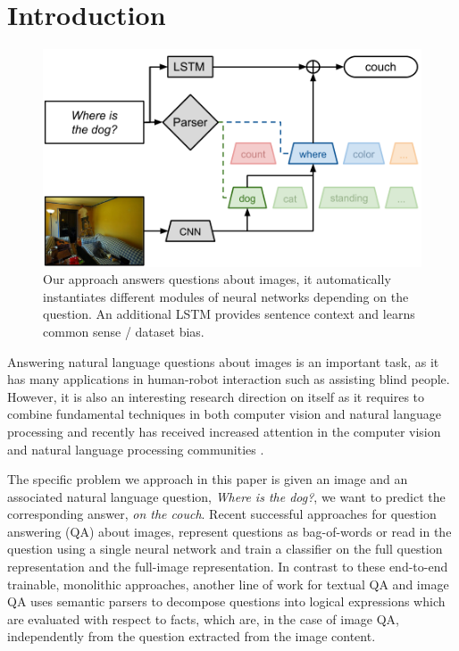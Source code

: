\section{Introduction} 

\begin{figure}[t] \begin{center}
    \includegraphics[width=\linewidth]{fig/teaser} \end{center} \caption{Our
    approach answers questions about images, it automatically instantiates
    different modules of neural networks depending on the question. An
    additional LSTM provides sentence context and learns common sense / dataset
  bias.} \label{fig:teaser}
\end{figure}
Answering natural language questions about images is an important task, as it
has many applications in human-robot interaction such as assisting blind people.
However, it is also an interesting research direction on itself as it requires
to combine fundamental techniques in both computer vision and natural language
processing and recently has received increased attention in the computer vision
and natural language processing communities
\cite{antol15iccv,gao2015you,ma15arxiv,malinowski15iccv,ren2015image,yu15arxiv}.

The specific problem we approach in this paper is given an image and an
associated natural language question, \eg \emph{Where is the dog?}, we want to
predict the corresponding answer, \eg \emph{on the couch}.  Recent successful
approaches for question answering (QA) about images, represent questions as
bag-of-words \cite{} or read in the question using a single neural network
\cite{malinowski15iccv}\cite{} and train a classifier on the full question
representation and the full-image representation. In contrast to these
end-to-end trainable, monolithic approaches, another line of work for textual QA
\cite{Liang13DCS} and image QA\cite{malinowski14nips} uses semantic parsers to
decompose questions into logical expressions which are evaluated with respect to
facts, which are, in the case of image QA, independently from the question
extracted from the image content.

